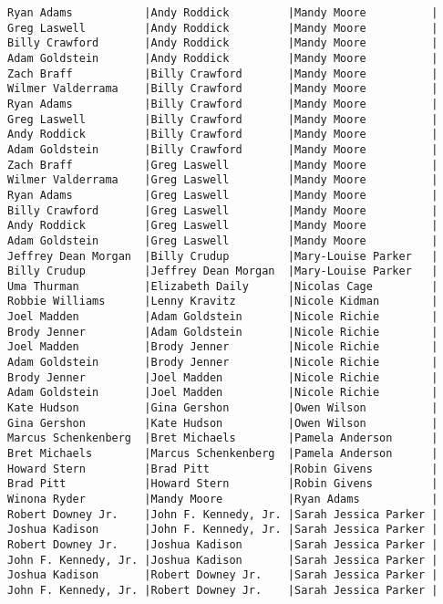 \documentclass{article}
\begin{document}
\begin{verbatim}
Ryan Adams           |Andy Roddick         |Mandy Moore          |
Greg Laswell         |Andy Roddick         |Mandy Moore          |
Billy Crawford       |Andy Roddick         |Mandy Moore          |
Adam Goldstein       |Andy Roddick         |Mandy Moore          |
Zach Braff           |Billy Crawford       |Mandy Moore          |
Wilmer Valderrama    |Billy Crawford       |Mandy Moore          |
Ryan Adams           |Billy Crawford       |Mandy Moore          |
Greg Laswell         |Billy Crawford       |Mandy Moore          |
Andy Roddick         |Billy Crawford       |Mandy Moore          |
Adam Goldstein       |Billy Crawford       |Mandy Moore          |
Zach Braff           |Greg Laswell         |Mandy Moore          |
Wilmer Valderrama    |Greg Laswell         |Mandy Moore          |
Ryan Adams           |Greg Laswell         |Mandy Moore          |
Billy Crawford       |Greg Laswell         |Mandy Moore          |
Andy Roddick         |Greg Laswell         |Mandy Moore          |
Adam Goldstein       |Greg Laswell         |Mandy Moore          |
Jeffrey Dean Morgan  |Billy Crudup         |Mary-Louise Parker   |
Billy Crudup         |Jeffrey Dean Morgan  |Mary-Louise Parker   |
Uma Thurman          |Elizabeth Daily      |Nicolas Cage         |
Robbie Williams      |Lenny Kravitz        |Nicole Kidman        |
Joel Madden          |Adam Goldstein       |Nicole Richie        |
Brody Jenner         |Adam Goldstein       |Nicole Richie        |
Joel Madden          |Brody Jenner         |Nicole Richie        |
Adam Goldstein       |Brody Jenner         |Nicole Richie        |
Brody Jenner         |Joel Madden          |Nicole Richie        |
Adam Goldstein       |Joel Madden          |Nicole Richie        |
Kate Hudson          |Gina Gershon         |Owen Wilson          |
Gina Gershon         |Kate Hudson          |Owen Wilson          |
Marcus Schenkenberg  |Bret Michaels        |Pamela Anderson      |
Bret Michaels        |Marcus Schenkenberg  |Pamela Anderson      |
Howard Stern         |Brad Pitt            |Robin Givens         |
Brad Pitt            |Howard Stern         |Robin Givens         |
Winona Ryder         |Mandy Moore          |Ryan Adams           |
Robert Downey Jr.    |John F. Kennedy, Jr. |Sarah Jessica Parker |
Joshua Kadison       |John F. Kennedy, Jr. |Sarah Jessica Parker |
Robert Downey Jr.    |Joshua Kadison       |Sarah Jessica Parker |
John F. Kennedy, Jr. |Joshua Kadison       |Sarah Jessica Parker |
Joshua Kadison       |Robert Downey Jr.    |Sarah Jessica Parker |
John F. Kennedy, Jr. |Robert Downey Jr.    |Sarah Jessica Parker |

\end{verbatim}
\end{document}
